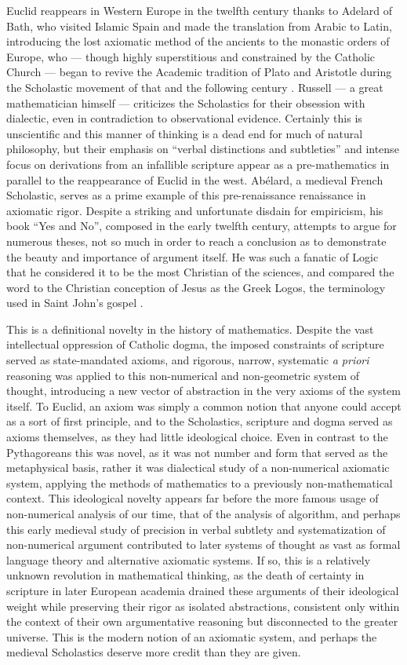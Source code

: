 \documentclass[12pt]{article}
\begin{document}
Euclid reappears in Western Europe
in the twelfth century
thanks to Adelard of Bath,
who visited Islamic Spain
and made the translation
from Arabic to Latin,
introducing the lost axiomatic method of the ancients
to the monastic orders of Europe,
who --- though highly superstitious
and constrained by the Catholic Church ---
began to revive the Academic tradition
of Plato and Aristotle during the Scholastic movement
of that and the following century \cite{russell}.
Russell --- a great mathematician himself ---
criticizes the Scholastics for their obsession
with dialectic, even in contradiction to observational evidence.
Certainly this is unscientific and this manner of thinking
is a dead end for much of natural philosophy,
but their emphasis on ``verbal distinctions and subtleties''
and intense focus on derivations from an infallible
scripture appear as a pre-mathematics in parallel
to the reappearance of Euclid in the west.
Ab\'elard, a medieval French Scholastic,
serves as a prime example of this pre-renaissance renaissance
in axiomatic rigor.
Despite a striking and unfortunate disdain for empiricism,
his book ``Yes and No'',
composed in the early twelfth century,
attempts to argue for numerous theses,
not so much in order to reach a conclusion
as to demonstrate
the beauty and importance 
of argument itself.
He was such a fanatic of Logic
that he considered it to be the
most Christian of the sciences,
and compared the word to the Christian
conception of Jesus as the Greek Logos,
the terminology used in Saint John's gospel \cite{russell}.

This is a definitional novelty in the history of mathematics.
Despite the vast intellectual oppression of Catholic dogma,
the imposed constraints of scripture served as state-mandated axioms,
and rigorous, narrow, systematic \textit{a priori} reasoning
was applied to this non-numerical and non-geometric
system of thought,
introducing a new vector of abstraction
in the very axioms of the system itself.
To Euclid, an axiom was simply a common notion
that anyone could accept as a sort of first principle,
and to the Scholastics, scripture and dogma served
as axioms themselves, as they had little ideological choice.
Even in contrast to the Pythagoreans this was novel,
as it was not number and form that served as the metaphysical basis,
rather it was dialectical study of a non-numerical axiomatic system,
applying the methods of mathematics to a previously non-mathematical context.
This ideological novelty appears far before the more famous usage
of non-numerical analysis of our time,
that of the analysis of algorithm,
and perhaps this early medieval study of precision in verbal subtlety
and systematization of non-numerical argument
contributed to later systems of thought as vast as formal language theory
and alternative axiomatic systems.
If so, this is a relatively unknown revolution in mathematical thinking,
as the death of certainty in scripture in later European academia
drained these arguments of their ideological weight
while preserving their rigor as isolated abstractions,
consistent only within the context of their own argumentative reasoning
but disconnected to the greater universe.
This is the modern notion of an axiomatic system,
and perhaps the medieval Scholastics deserve more credit than they are given.
\end{document}
